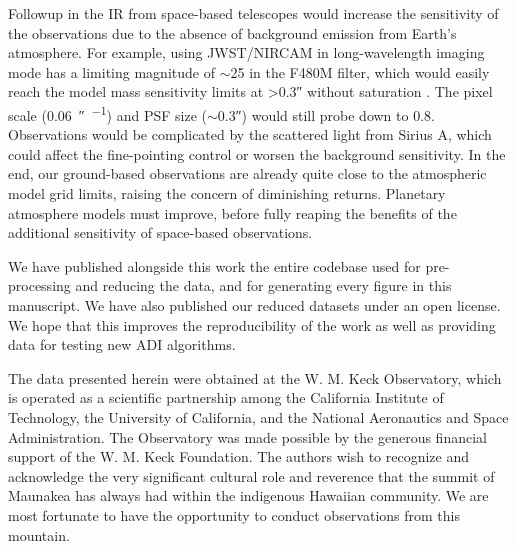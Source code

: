 \documentclass[twocolumn,linenumbers]{aastex631}
\begin{document}
Followup in the IR from space-based telescopes would increase the sensitivity of the observations due to the absence of background emission from Earth's atmosphere. For example, using JWST/NIRCAM in long-wavelength imaging mode has a limiting magnitude of $\sim$25 in the F480M filter, which would easily reach the model mass sensitivity limits at \textgreater\ang{;;0.3} without saturation \citep{pontoppidan_pandeia_2016}. The pixel scale (\qty{0.06}{\arcsecond\per\pixel}) and PSF size ($\sim$\ang{;;0.3}) would still probe down to \qty{0.8}{\au}. Observations would be complicated by the scattered light from Sirius A, which could affect the fine-pointing control or worsen the background sensitivity. In the end, our ground-based observations are already quite close to the atmospheric model grid limits, raising the concern of diminishing returns. Planetary atmosphere models must improve, before fully reaping the benefits of the additional sensitivity of space-based observations.

We have published alongside this work the entire codebase used for pre-processing and reducing the data, and for generating every figure in this manuscript. We have also published our reduced datasets under an open license. We hope that this improves the reproducibility of the work as well as providing data for testing new ADI algorithms.

\begin{acknowledgements}
The data presented herein were obtained at the W. M. Keck Observatory, which is operated as a scientific partnership among the California Institute of Technology, the University of California, and the National Aeronautics and Space Administration. The Observatory was made possible by the generous financial support of the W. M. Keck Foundation. The authors wish to recognize and acknowledge the very significant cultural role and reverence that the summit of Maunakea has always had within the indigenous Hawaiian community. We are most fortunate to have the opportunity to conduct observations from this mountain.
\end{acknowledgements}




{}

\end{document}
